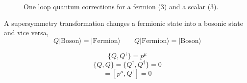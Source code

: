 \begin{figure}[hb]
  \centering
  \begin{subfigure}[trim = 0mm 0mm 0mm 0mm, clip, width=3cm]{.4\textwidth}
                \caption{}
                \label{fig:fermionLoop}
\end{subfigure}
\begin{subfigure}[trim = 0mm 0mm 0mm 0mm, clip, width=3cm]{.4\textwidth}
	\caption{}
                \label{fig:scalarLoop}
                	
  \end{subfigure}
   \caption[]{One loop quantum corrections for a fermion (\ref{fig:scalarLoop}) and a scalar (\ref{fig:scalarLoop}). }
\end{figure}

A supersymmetry transformation changes a fermionic state into a bosonic state and vice versa,
\begin{equation}
Q|\mathrm{Boson}\rangle=|\mathrm{Fermion}\rangle \qquad Q|\mathrm{Fermion}\rangle=|\mathrm{Boson}\rangle
\end{equation}

\begin{equation}
\{Q,Q^{\dagger}\}=p^{\mu}
\end{equation}
\begin{equation}
\{Q,Q\}=\{Q^{\dagger},Q^{\dagger}\}=0
\end{equation}
\begin{equation}
[p^{\mu},Q ]=[p^{\mu},Q^{\dagger}]=0
\end{equation}

